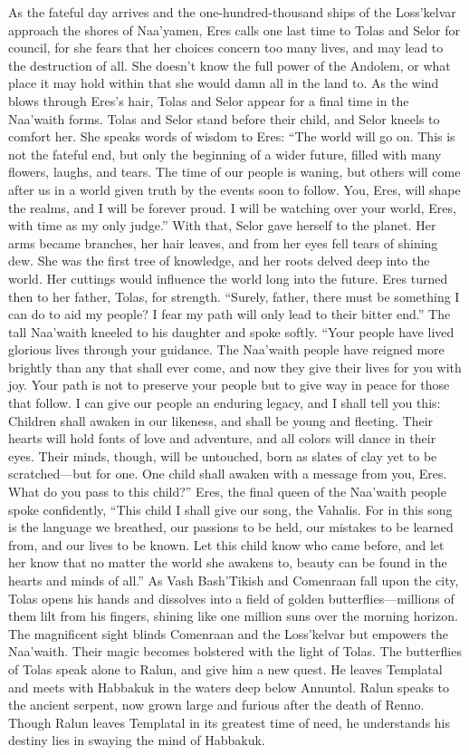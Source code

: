\documentclass[smalldemyvopaper,11pt,twoside,onecolumn,openright,extrafontsizes]{memoir}
\begin{document}
As the fateful day arrives and the one-hundred-thousand ships of the Loss’kelvar approach the shores of Naa’yamen, Eres calls one last time to Tolas and Selor for council, for she fears that her choices concern too many lives, and may lead to the destruction of all. She doesn’t know the full power of the Andolem, or what place it may hold within that she would damn all in the land to. As the wind blows through Eres’s hair, Tolas and Selor appear for a final time in the Naa’waith forms.  Tolas and Selor stand before their child, and Selor kneels to comfort her. She speaks words of wisdom to Eres: “The world will go on. This is not the fateful end, but only the beginning of a wider future, filled with many flowers, laughs, and tears. The time of our people is waning, but others will come after us in a world given truth by the events soon to follow. You, Eres, will shape the realms, and I will be forever proud. I will be watching over your world, Eres, with time as my only judge.” With that, Selor gave herself to the planet. Her arms became branches, her hair leaves, and from her eyes fell tears of shining dew. She was the first tree of knowledge, and her roots delved deep into the world. Her cuttings would influence the world long into the future. Eres turned then to her father, Tolas, for strength. “Surely, father, there must be something I can do to aid my people? I fear my path will only lead to their bitter end.” The tall Naa’waith kneeled to his daughter and spoke softly. “Your people have lived glorious lives through your guidance. The Naa’waith people have reigned more brightly than any that shall ever come, and now they give their lives for you with joy. Your path is not to preserve your people but to give way in peace for those that follow. I can give our people an enduring legacy, and I shall tell you this: Children shall awaken in our likeness, and shall be young and fleeting. Their hearts will hold fonts of love and adventure, and all colors will dance in their eyes. Their minds, though, will be untouched, born as slates of clay yet to be scratched—but for one. One child shall awaken with a message from you, Eres. What do you pass to this child?” Eres, the final queen of the Naa’waith people spoke confidently, “This child I shall give our song, the Vahalis. For in this song is the language we breathed, our passions to be held, our mistakes to be learned from, and our lives to be known. Let this child know who came before, and let her know that no matter the world she awakens to, beauty can be found in the hearts and minds of all.”
As Vash Bash’Tikish and Comenraan fall upon the city, Tolas opens his hands and dissolves into a field of golden butterflies—millions of them lilt from his fingers, shining like one million suns over the morning horizon. The magnificent sight blinds Comenraan and the Loss’kelvar but empowers the Naa’waith. Their magic becomes bolstered with the light of Tolas. The butterflies of Tolas speak alone to Ralun, and give him a new quest. He leaves Templatal and meets with Habbakuk in the waters deep below Annuntol. Ralun speaks to the ancient serpent, now grown large and furious after the death of Renno. Though Ralun leaves Templatal in its greatest time of need, he understands his destiny lies in swaying the mind of Habbakuk.
\end{document}
